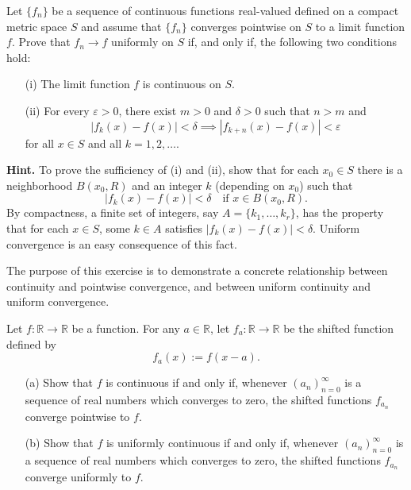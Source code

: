 \begin{problem}[20pts]
    Let $\{f_n\}$ be a sequence of continuous functions real-valued defined on a compact metric space $S$ and assume that $\{f_n\}$ converges pointwise on $S$ to a limit function $f$.  
Prove that $f_n \to f$ uniformly on $S$ if, and only if, the following two conditions hold:

\begin{enumerate}
  \item[(i)] The limit function $f$ is continuous on $S$.
  \item[(ii)] For every $\varepsilon > 0$, there exist $m > 0$ and $\delta > 0$ such that $n > m$ and 
  \[
  |f_k(x) - f(x)| < \delta \implies |f_{k+n}(x) - f(x)| < \varepsilon
  \]
  for all $x \in S$ and all $k = 1, 2, \dots$.
\end{enumerate}

\noindent\textbf{Hint.} To prove the sufficiency of (i) and (ii), show that for each $x_0 \in S$ there is a neighborhood $B(x_0, R)$ and an integer $k$ (depending on $x_0$) such that
\[
|f_k(x) - f(x)| < \delta \quad \text{if } x \in B(x_0,R).
\]
By compactness, a finite set of integers, say $A = \{k_1, \dots, k_r\}$, has the property that for each $x \in S$, some $k \in A$ satisfies $|f_k(x) - f(x)| < \delta$.  
Uniform convergence is an easy consequence of this fact.
\end{problem}
\begin{problem}[15pts]
    The purpose of this exercise is to demonstrate a concrete relationship between continuity and pointwise convergence, and between uniform continuity and uniform convergence. 

Let $f:\mathbb{R} \to \mathbb{R}$ be a function. For any $a \in \mathbb{R}$, let $f_a : \mathbb{R} \to \mathbb{R}$ be the shifted function defined by
\[
f_a(x) := f(x - a).
\]

\begin{enumerate}
  \item[(a)] Show that $f$ is continuous if and only if, whenever $(a_n)_{n=0}^\infty$ is a sequence of real numbers which converges to zero, the shifted functions $f_{a_n}$ converge pointwise to $f$.

  \item[(b)] Show that $f$ is uniformly continuous if and only if, whenever $(a_n)_{n=0}^\infty$ is a sequence of real numbers which converges to zero, the shifted functions $f_{a_n}$ converge uniformly to $f$.
\end{enumerate}

\end{problem}
